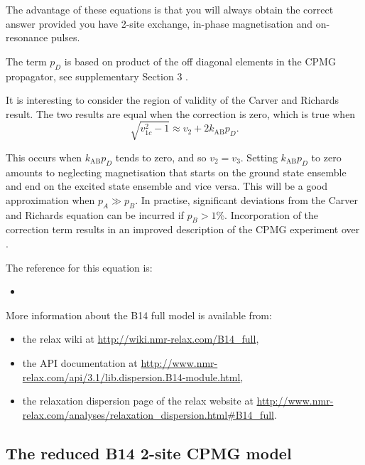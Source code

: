 The advantage of these equations is that you will always obtain the correct answer provided you have 2-site exchange, in-phase magnetisation and on-resonance pulses. 

The term $p_D$ is based on product of the off diagonal elements in the CPMG propagator, see supplementary Section 3 \citep{Baldwin2014}.

It is interesting to consider the region of validity of the Carver and Richards result. The two results are equal when the correction is zero, which is true when
\begin{equation}
    \sqrt{v_{1c}^2-1} \approx v_2 + 2k_{\textrm{AB}}p_D .
\end{equation}

This occurs when $k_{\textrm{AB}}p_D$ tends to zero, and so $v_2=v_3$.
Setting $k_{\textrm{AB}}p_D$ to zero amounts to neglecting magnetisation that starts on the ground state ensemble and end on the excited state ensemble and vice versa. 
This will be a good approximation when $p_A \gg p_B$.
In practise, significant deviations from the Carver and Richards equation can be incurred if $p_B > 1$\%.
Incorporation of the correction term results in an improved description of the CPMG experiment over \citet{CarverRichards72}.

The reference for this equation is:
\begin{itemize}
  \item {}
\end{itemize}

More information about the B14 full model is available from:
\begin{itemize}
  \item the relax wiki at \url{http://wiki.nmr-relax.com/B14\_full},
  \item the API documentation at \url{http://www.nmr-relax.com/api/3.1/lib.dispersion.B14-module.html},
  \item the relaxation dispersion page of the relax website at \url{http://www.nmr-relax.com/analyses/relaxation\_dispersion.html#B14\_full}.
\end{itemize}



\subsection{The reduced B14 2-site CPMG model}
\label{sect: dispersion: B14 model}


